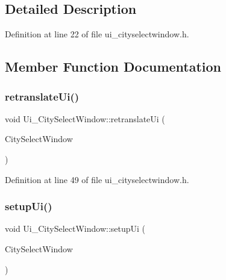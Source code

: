 \subsection{Detailed Description}


Definition at line 22 of file ui\+\_\+cityselectwindow.\+h.



\subsection{Member Function Documentation}
\mbox{\label{class_ui___city_select_window_ae7ea20821b449c19c09ae9ca73f03daf}} 
\subsubsection{\texorpdfstring{retranslateUi()}{retranslateUi()}}
{\footnotesize\ttfamily void Ui\+\_\+\+City\+Select\+Window\+::retranslate\+Ui (\begin{DoxyParamCaption}\item[{Q\+Widget $\ast$}]{City\+Select\+Window }\end{DoxyParamCaption})\hspace{0.3cm}{\ttfamily [inline]}}



Definition at line 49 of file ui\+\_\+cityselectwindow.\+h.

\mbox{\label{class_ui___city_select_window_a0984abfece713da5e3ef219fd6b4b640}} 
\subsubsection{\texorpdfstring{setupUi()}{setupUi()}}
{\footnotesize\ttfamily void Ui\+\_\+\+City\+Select\+Window\+::setup\+Ui (\begin{DoxyParamCaption}\item[{Q\+Widget $\ast$}]{City\+Select\+Window }\end{DoxyParamCaption})\hspace{0.3cm}{\ttfamily [inline]}}




